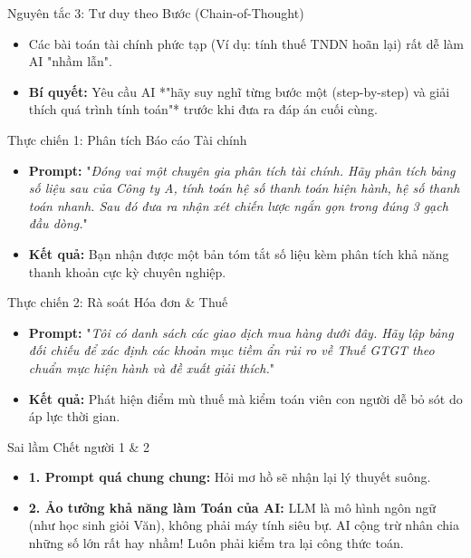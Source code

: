 \documentclass[aspectratio=169,12pt]{beamer}
\begin{document}
\begin{frame}{Nguyên tắc 3: Tư duy theo Bước (Chain-of-Thought)}
    \begin{itemize}
        \item Các bài toán tài chính phức tạp (Ví dụ: tính thuế TNDN hoãn lại) rất dễ làm AI "nhầm lẫn".
        \item \textbf{Bí quyết:} Yêu cầu AI *"hãy suy nghĩ từng bước một (step-by-step) và giải thích quá trình tính toán"* trước khi đưa ra đáp án cuối cùng.
    \end{itemize}
\end{frame}

\begin{frame}{Thực chiến 1: Phân tích Báo cáo Tài chính}
    \begin{itemize}
        \item \textbf{Prompt:} "\textit{Đóng vai một chuyên gia phân tích tài chính. Hãy phân tích bảng số liệu sau của Công ty A, tính toán hệ số thanh toán hiện hành, hệ số thanh toán nhanh. Sau đó đưa ra nhận xét chiến lược ngắn gọn trong đúng 3 gạch đầu dòng.}"
        \item \textbf{Kết quả:} Bạn nhận được một bản tóm tắt số liệu kèm phân tích khả năng thanh khoản cực kỳ chuyên nghiệp.
    \end{itemize}
\end{frame}

\begin{frame}{Thực chiến 2: Rà soát Hóa đơn \& Thuế}
    \begin{itemize}
        \item \textbf{Prompt:} "\textit{Tôi có danh sách các giao dịch mua hàng dưới đây. Hãy lập bảng đối chiếu để xác định các khoản mục tiềm ẩn rủi ro về Thuế GTGT theo chuẩn mực hiện hành và đề xuất giải thích.}"
        \item \textbf{Kết quả:} Phát hiện điểm mù thuế mà kiểm toán viên con người dễ bỏ sót do áp lực thời gian.
    \end{itemize}
\end{frame}

\begin{frame}{Sai lầm Chết người 1 \& 2}
    \begin{itemize}
        \item \textbf{1. Prompt quá chung chung:} Hỏi mơ hồ sẽ nhận lại lý thuyết suông.
        \item \textbf{2. Ảo tưởng khả năng làm Toán của AI:} LLM là mô hình ngôn ngữ (như học sinh giỏi Văn), không phải máy tính siêu bự. AI cộng trừ nhân chia những số lớn rất hay nhầm! Luôn phải kiểm tra lại công thức toán.
    \end{itemize}
\end{frame}
\end{document}
